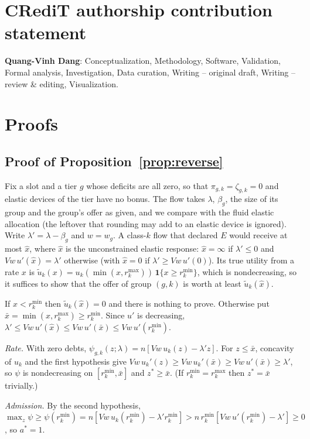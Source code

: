 \documentclass[preprint,11pt]{elsarticle}
\theoremstyle{definition}
\theoremstyle{remark}
\newcommand{\rmin}{r^{\min}}
\newcommand{\rmax}{r^{\max}}
\newcommand{\ind}{\mathbf{1}}
\begin{document}
\section*{CRediT authorship contribution statement}
\textbf{Quang-Vinh Dang}: Conceptualization, Methodology, Software, Validation, Formal analysis, Investigation, Data curation, Writing -- original draft, Writing -- review \& editing, Visualization.

\appendix
\section{Proofs}\label{app:proofs}

\subsection{Proof of Proposition~\ref{prop:reverse}}\label{app:reverse}

Fix a slot and a tier $g$ whose deficits are all zero, so that $\pi_{g,k}=\zeta_{g,k}=0$ and elastic devices of the tier have no bonus.
The flow takes $\lambda$, $\beta_g$, the size of its group and the group's offer as given, and we compare with the fluid elastic allocation (the leftover that rounding may add to an elastic device is ignored).
Write $\lambda'=\lambda-\beta_g$ and $w=w_g$.
A class-$k$ flow that declared $E$ would receive at most $\hat x$, where $\hat x$ is the unconstrained elastic response: $\hat x=\infty$ if $\lambda'\le0$ and $Vw\,u'(\hat x)=\lambda'$ otherwise (with $\hat x=0$ if $\lambda'\ge Vw\,u'(0)$).
Its true utility from a rate $x$ is $\tilde u_k(x)=u_k(\min(x,\rmax_k))\,\ind\{x\ge\rmin_k\}$, which is nondecreasing, so it suffices to show that the offer of group $(g,k)$ is worth at least $\tilde u_k(\hat x)$.

If $\hat x<\rmin_k$ then $\tilde u_k(\hat x)=0$ and there is nothing to prove.
Otherwise put $\bar x=\min(\hat x,\rmax_k)\ge\rmin_k$.
Since $u'$ is decreasing, $\lambda'\le Vw\,u'(\hat x)\le Vw\,u'(\bar x)\le Vw\,u'(\rmin_k)$.

\emph{Rate.} With zero debts, $\psi_{g,k}(z;\lambda)=n[Vw\,u_k(z)-\lambda'z]$. For $z\le\bar x$, concavity of $u_k$ and the first hypothesis give $Vw\,u_k'(z)\ge Vw\,u_k'(\bar x)\ge Vw\,u'(\bar x)\ge\lambda'$, so $\psi$ is nondecreasing on $[\rmin_k,\bar x]$ and $z^*\ge\bar x$. (If $\rmin_k=\rmax_k$ then $z^*=\bar x$ trivially.)

\emph{Admission.} By the second hypothesis, $\max_z\psi\ge\psi(\rmin_k)=n[Vw\,u_k(\rmin_k)-\lambda'\rmin_k]\allowbreak>n\,\rmin_k[Vw\,u'(\rmin_k)-\lambda']\ge0$, so $a^*=1$.
\end{document}
